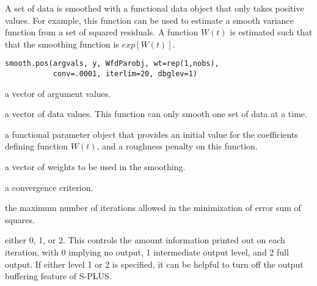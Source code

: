 \begin{Description}\relax
A set of data is smoothed with a functional data object that only
takes positive values.  For example, this function can be used
to estimate a smooth variance function from a set of squared residuals.
A function $W(t)$ is estimated such that that the smoothing
function is $exp[W(t)]$.
\end{Description}
\begin{Usage}
\begin{verbatim}
smooth.pos(argvals, y, WfdParobj, wt=rep(1,nobs),
           conv=.0001, iterlim=20, dbglev=1)
\end{verbatim}
\end{Usage}
\begin{Arguments}
\begin{ldescription}
\item[\code{argvals}] a vector of argument values.

\item[\code{y}] a vector of data values.  This function can only smooth
one set of data at a time.

\item[\code{WfdParobj}] a functional parameter object that provides an initial
value for the coefficients defining function $W(t)$,
and a roughness penalty on this function.

\item[\code{wt}] a vector of weights to be used in the smoothing.

\item[\code{conv}] a convergence criterion.

\item[\code{iterlim}] the maximum number of iterations allowed in the minimization
of error sum of squares.

\item[\code{dbglev}] either 0, 1, or 2.  This controls the amount information printed out on
each iteration, with 0 implying no output, 1 intermediate output level,
and 2 full output.  If either level 1 or 2 is specified, it can be
helpful to turn off the output buffering feature of S-PLUS.

\end{ldescription}
\end{Arguments}
